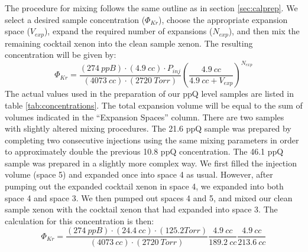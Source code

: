 The procedure for mixing follows the same outline as in section \ref{sec:calprep}. We select a desired sample concentration ($\Phi_{Kr}$), choose the appropriate expansion space ($V_{exp}$), expand the required number of expansions ($N_{exp}$), and then mix the remaining cocktail xenon into the clean sample xenon. The resulting concentration will be given by:
\begin{equation}
\Phi_{Kr}=\frac{(274 \ ppB)\cdot (4.9 \ cc)\cdot P_{inj}}{(4073 \ cc)\cdot (2720 \ Torr)}\left(\frac{4.9 \ cc}{4.9 \ cc + V_{exp}}\right)^{N_{exp}}
\end{equation}
The actual values used in the preparation of our ppQ level samples are listed in table \ref{tab:concentrations}. The total expansion volume will be equal to the sum of volumes indicated in the ``Expansion Spaces'' column. There are two samples with slightly altered mixing procedures. The 21.6 ppQ sample was prepared by completing two consecutive injections using the same mixing parameters in order to approximately double the previous 10.8 ppQ concentration. The 46.1 ppQ sample was prepared in a slightly more complex way. We first filled the injection volume (space 5) and expanded once into space 4 as usual. However, after pumping out the expanded cocktail xenon in space 4, we expanded into both space 4 and space 3. We then pumped out spaces 4 and 5, and mixed our clean sample xenon with the cocktail xenon that had expanded into space 3. The calculation for this concentration is then:
\begin{equation}
\Phi_{Kr}=\frac{(274 \ ppB)\cdot ( 24.4 \ cc)\cdot (125.2 Torr)}{(4073 \ cc)\cdot (2720 \ Torr)}\frac{4.9 \ cc}{189.2 \ cc }\frac{4.9 \ cc}{213.6 \ cc }
\end{equation}


